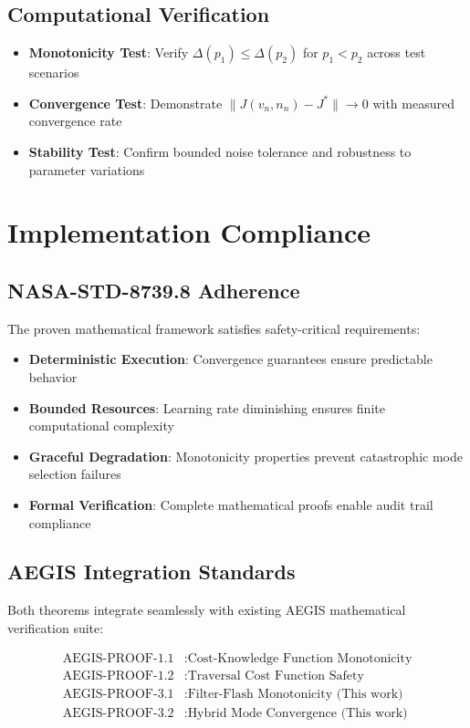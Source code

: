 \documentclass[11pt]{article}
\theoremstyle{definition}
\begin{document}
\subsection{Computational Verification}

\begin{itemize}
\item \textbf{Monotonicity Test}: Verify $\Delta(p_1) \leq \Delta(p_2)$ for $p_1 < p_2$ across test scenarios
\item \textbf{Convergence Test}: Demonstrate $\|J(v_n, n_n) - J^*\| \to 0$ with measured convergence rate
\item \textbf{Stability Test}: Confirm bounded noise tolerance and robustness to parameter variations
\end{itemize}

\section{Implementation Compliance}

\subsection{NASA-STD-8739.8 Adherence}

The proven mathematical framework satisfies safety-critical requirements:

\begin{itemize}
\item \textbf{Deterministic Execution}: Convergence guarantees ensure predictable behavior
\item \textbf{Bounded Resources}: Learning rate diminishing ensures finite computational complexity
\item \textbf{Graceful Degradation}: Monotonicity properties prevent catastrophic mode selection failures
\item \textbf{Formal Verification}: Complete mathematical proofs enable audit trail compliance
\end{itemize}

\subsection{AEGIS Integration Standards}

Both theorems integrate seamlessly with existing AEGIS mathematical verification suite:

\begin{align}
\text{AEGIS-PROOF-1.1} &: \text{Cost-Knowledge Function Monotonicity} \\
\text{AEGIS-PROOF-1.2} &: \text{Traversal Cost Function Safety} \\
\text{AEGIS-PROOF-3.1} &: \text{Filter-Flash Monotonicity (This work)} \\
\text{AEGIS-PROOF-3.2} &: \text{Hybrid Mode Convergence (This work)}
\end{align}
\end{document}
